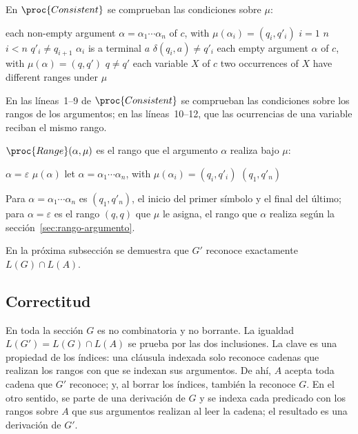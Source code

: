 \documentclass{report}
\theoremstyle{definition}
\theoremstyle{plain}
\begin{document}
En $\proc{Consistent}$ se comprueban las condiciones sobre $\mu$:

\begin{codebox}
\li \For each non-empty argument $\alpha = \alpha_1 \cdots \alpha_n$ of $c$, with $\mu(\alpha_i) = (q_i, q'_i)$
\li \Do
        \For $i = 1$ \To $n$
\li     \Do
            \If $i < n$  $q'_i \neq q_{i+1}$
\li         \Then \Return {}
            \End
\li         \If $\alpha_i$ is a terminal $a$  $\delta(q_i, a) \neq q'_i$
\li         \Then \Return {}
            \End
        \End
    \End
\li \For each empty argument $\alpha$ of $c$, with $\mu(\alpha) = (q, q')$
\li \Do
        \If $q \neq q'$
\li     \Then \Return {}
        \End
    \End
\li \For each variable $X$ of $c$
\li \Do
        \If two occurrences of $X$ have different ranges under $\mu$
\li     \Then \Return {}
        \End
    \End
\li \Return {}
\end{codebox}

En las líneas~1--9 de $\proc{Consistent}$ se comprueban las condiciones
sobre los rangos de los argumentos; en las líneas~10--12, que las
ocurrencias de una variable reciban el mismo rango.

$\proc{Range}(\alpha, \mu)$ es el rango que el argumento $\alpha$
realiza bajo $\mu$:

\begin{codebox}
\li \If $\alpha = \varepsilon$
\li \Then \Return $\mu(\alpha)$
    \End
\li let $\alpha = \alpha_1 \cdots \alpha_n$, with $\mu(\alpha_i) = (q_i, q'_i)$
\li \Return $(q_1, q'_n)$
\end{codebox}

Para $\alpha = \alpha_1 \cdots \alpha_n$ es $(q_1, q'_n)$, el inicio del
primer símbolo y el final del último; para $\alpha = \varepsilon$ es el
rango $(q, q)$ que $\mu$ le asigna, el rango que $\alpha$ realiza según
la sección~\ref{sec:rango-argumento}.

En la próxima subsección se demuestra que $G'$ reconoce
exactamente $L(G) \cap L(A)$.

\subsection{Correctitud}

En toda la sección $G$ es no combinatoria y no borrante. La igualdad
$L(G') = L(G) \cap L(A)$ se prueba por las dos inclusiones.
La clave es una propiedad de los índices: una cláusula indexada solo
reconoce cadenas que realizan los rangos con que se indexan sus
argumentos. De ahí, $A$ acepta toda cadena que $G'$ reconoce; y, al
borrar los índices, también la reconoce $G$. En el otro sentido, se
parte de una derivación de $G$ y se indexa cada predicado con los rangos
sobre $A$ que sus argumentos realizan al leer la cadena; el resultado es
una derivación de $G'$.
\end{document}
